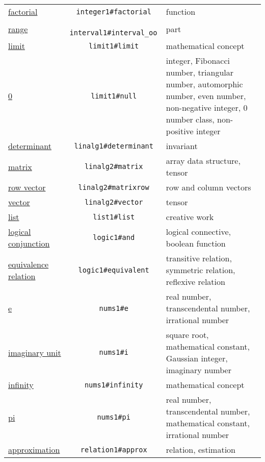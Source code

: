 \documentclass[a4paper]{article}
\begin{document}
\begin{table}[p]
\begin{tabular}{p{.23\linewidth}cp{.5\linewidth}}
\href{https://www.wikidata.org/entity/Q120976}{factorial} &\texttt{ integer1\#factorial }& function \\
\href{https://www.wikidata.org/entity/Q40548497}{range} &\texttt{ interval1\#interval\_oo }& part \\
\href{https://www.wikidata.org/entity/Q177239}{limit} &\texttt{ limit1\#limit }& mathematical concept \\
\href{https://www.wikidata.org/entity/Q204}{0} &\texttt{ limit1\#null }& integer, Fibonacci number, triangular number, automorphic number, even number, non-negative integer, 0 number class, non-positive integer \\
\href{https://www.wikidata.org/entity/Q178546}{determinant} &\texttt{ linalg1\#determinant }& invariant \\
\href{https://www.wikidata.org/entity/Q44337}{matrix} &\texttt{ linalg2\#matrix }& array data structure, tensor \\
\href{https://www.wikidata.org/entity/Q2916003}{row vector} &\texttt{ linalg2\#matrixrow }& row and column vectors \\
\href{https://www.wikidata.org/entity/Q13471665}{vector} &\texttt{ linalg2\#vector }& tensor \\
\href{https://www.wikidata.org/entity/Q12139612}{list} &\texttt{ list1\#list }& creative work \\
\href{https://www.wikidata.org/entity/Q191081}{logical conjunction} &\texttt{ logic1\#and }& logical connective, boolean function \\
\href{https://www.wikidata.org/entity/Q130998}{equivalence relation} &\texttt{ logic1\#equivalent }& transitive relation, symmetric relation, reflexive relation \\
\href{https://www.wikidata.org/entity/Q82435}{e} &\texttt{ nums1\#e }& real number, transcendental number, irrational number \\
\href{https://www.wikidata.org/entity/Q193796}{imaginary unit} &\texttt{ nums1\#i }& square root, mathematical constant, Gaussian integer, imaginary number \\
\href{https://www.wikidata.org/entity/Q205}{infinity} &\texttt{ nums1\#infinity }& mathematical concept \\
\href{https://www.wikidata.org/entity/Q167}{pi} &\texttt{ nums1\#pi }& real number, transcendental number, mathematical constant, irrational number \\
\href{https://www.wikidata.org/entity/Q27058}{approximation} &\texttt{ relation1\#approx }& relation, estimation \\

\end{tabular}
\end{table}
\end{document}
